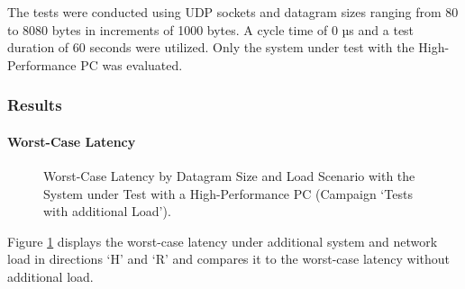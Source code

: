 The tests were conducted using UDP sockets and datagram sizes ranging from 80 to 8080 bytes in increments of 1000 bytes. A cycle time of 0 µs and a test duration of 60 seconds were utilized. Only the system under test with the High-Performance PC was evaluated.

\subsubsection{Results}
\paragraph{Worst-Case Latency}

\begin{figure}[h!]
  \centering
  \caption{Worst-Case Latency by Datagram Size and Load Scenario with the System under Test with a High-Performance PC (Campaign `Tests with additional Load').}
  \label{fig:StressWc}
\end{figure}

Figure \ref{fig:StressWc} displays the worst-case latency under additional system and network load in directions `H' and `R' and compares it to the worst-case latency without additional load.

